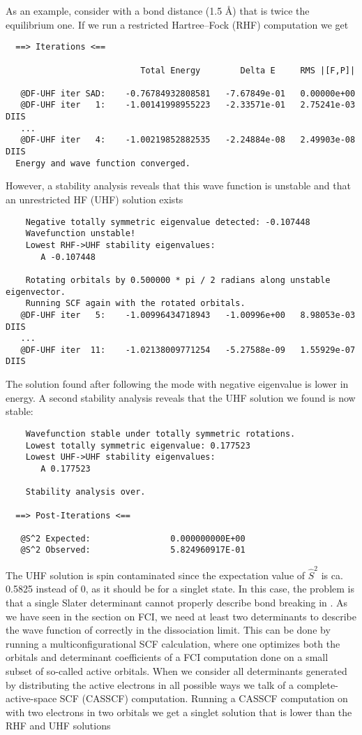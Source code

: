 \documentclass[../Main/chem532-notes.tex]{subfiles}
\begin{document}
As an example, consider  with a bond distance (1.5 \AA{}) that is twice the equilibrium one. If we run a restricted Hartree--Fock (RHF) computation we get
\begin{verbatim}
  ==> Iterations <==

                           Total Energy        Delta E     RMS |[F,P]|

   @DF-UHF iter SAD:    -0.76784932808581   -7.67849e-01   0.00000e+00
   @DF-UHF iter   1:    -1.00141998955223   -2.33571e-01   2.75241e-03 DIIS
   ...
   @DF-UHF iter   4:    -1.00219852882535   -2.24884e-08   2.49903e-08 DIIS
  Energy and wave function converged.
\end{verbatim}
However, a stability analysis reveals that this wave function is unstable and that an unrestricted HF (UHF) solution exists
\begin{verbatim}
    Negative totally symmetric eigenvalue detected: -0.107448
    Wavefunction unstable!
    Lowest RHF->UHF stability eigenvalues:
       A -0.107448
       
    Rotating orbitals by 0.500000 * pi / 2 radians along unstable eigenvector.
    Running SCF again with the rotated orbitals.
   @DF-UHF iter   5:    -1.00996434718943   -1.00996e+00   8.98053e-03 DIIS
   ...
   @DF-UHF iter  11:    -1.02138009771254   -5.27588e-09   1.55929e-07 DIIS       
\end{verbatim}
The solution found after following the mode with negative eigenvalue is lower in energy. A second stability analysis reveals that the UHF solution we found is now stable:
\begin{verbatim}
    Wavefunction stable under totally symmetric rotations.
    Lowest totally symmetric eigenvalue: 0.177523
    Lowest UHF->UHF stability eigenvalues:
       A 0.177523

    Stability analysis over.

  ==> Post-Iterations <==

   @S^2 Expected:                0.000000000E+00
   @S^2 Observed:                5.824960917E-01
\end{verbatim}
The UHF solution is spin contaminated since the expectation value of $\hat{S}^2$ is ca. 0.5825 instead of 0, as it should be for a singlet state.
In this case, the problem is that a single Slater determinant cannot properly describe bond breaking in . As we have seen in the section on FCI, we need at least two determinants to describe the wave function of  correctly in the dissociation limit. This can be done by running a multiconfigurational SCF calculation, where one optimizes both the orbitals and determinant coefficients of a FCI computation done on a small subset of so-called active orbitals. When we consider all determinants generated by distributing the active electrons in all possible ways we talk of a complete-active-space SCF (CASSCF) computation. Running a CASSCF computation on  with two electrons in two orbitals we get a singlet solution that is lower than the RHF and UHF solutions
\end{document}
